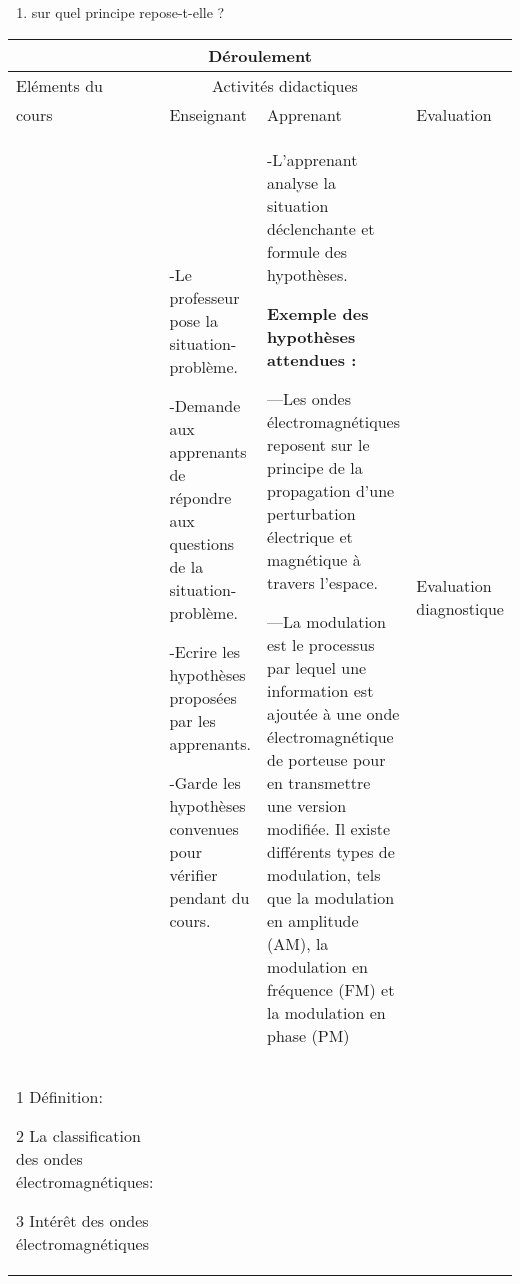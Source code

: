 \documentclass[12pt]{article}
\begin{document}
\begin{enumerate}
	\item sur quel principe repose-t-elle ?
\end{enumerate}

\begin{center}
	 \begin{tabular}{|p{}||p{}||p{}||p{}|}
\hline
\multicolumn{4}{|c|}{Déroulement}\\\hline
Eléments du & \multicolumn{2}{c||}{Activités didactiques} &  \\\cline{2-3}
cours & Enseignant & Apprenant & Evaluation\\\hline

\color{red}{I-Introduction}	  &
-Le professeur pose la situation-problème.

-Demande aux apprenants de répondre aux questions de la situation-problème.

-Ecrire les hypothèses proposées par les apprenants.

-Garde les hypothèses convenues pour vérifier pendant
du cours.
				  &
				  -L’apprenant analyse la situation déclenchante
et formule des hypothèses.

\textbf{Exemple des hypothèses attendues :}

---Les ondes électromagnétiques reposent sur le principe de la propagation d'une perturbation électrique et magnétique à travers l'espace. 

---La modulation est le processus par lequel une information est ajoutée à une onde électromagnétique de porteuse pour en transmettre une version modifiée. Il existe différents types de modulation, tels que la modulation en amplitude (AM), la modulation en fréquence (FM) et la modulation en phase (PM)

				  &
				  Evaluation
diagnostique\\\hline


\color{red}{II Les Ondes électromagnétiques- Transmission d’informations.}

\vspace{0.5cm}
\color{blue}1 Définition:
\vspace{0.5cm}

\color{blue}2
La classification des ondes électromagnétiques:
\vspace{0.5cm}

\color{blue}3
Intérêt des ondes électromagnétiques
\vspace{0.5cm}


\end{tabular}
\end{center}
\end{document}
